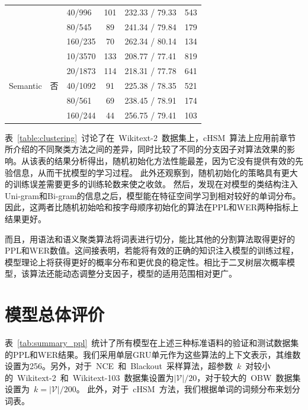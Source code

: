 \begin{table}[!t]
\begin{tabular}{lclccc}
    &&40/996 &101&232.33 / 79.33&543\\
    &&80/545 &89&241.34 / 79.84&179\\
    &&160/235 &70&262.34 / 80.14&134\\
  \midrule
  \multirow{5}{*}{Semantic}  &\multirow{5}{*}{否} &10/3570 &133&208.77 / 77.41&819\\
    & &20/1873 &114&218.31 / 77.78&641\\
    & &40/1092 &91&225.38 / 78.35&521\\
    & &80/561 &69&238.45 / 78.91&174\\
    & &160/244 &44&256.75 / 79.41&103\\
\bottomrule
  \end{tabular}
\end{table}

表~\ref{table:clustering}~讨论了在~Wikitext-2~数据集上，cHSM~算法上应用前章节所介绍的不同聚类方法之间的差异，同时比较了不同的分支因子对算法效果的影响。从该表的结果分析得出，随机初始化方法性能最差，因为它没有提供有效的先验信息，从而干扰模型的学习过程。
此外还观察到，随机初始化的策略具有更大的训练误差需要更多的训练轮数来使之收敛。
然后，发现在对模型的类结构注入Uni-gram和Bi-gram的信息之后，模型能在特征空间学习到相对较好的单词分布。
因此，这两者比随机初始哈和按字母顺序初始化的算法在PPL和WER两种指标上结果更好。

而且，用语法和语义聚类算法将词表进行切分，能比其他的分割算法取得更好的PPL和WER数值。这间接表明，若能将有效的正确的知识注入模型的训练过程，模型理论上将获得更好的概率分布和更优良的稳定性。相比于二叉树层次概率模型，该算法还能动态调整分支因子，模型的适用范围相对更广。

\section{模型总体评价}
表~\ref{tab:summary_ppl}~统计了所有模型在上述三种标准语料的验证和测试数据集的PPL和WER结果。我们采用单层GRU单元作为这些算法的上下文表示，其维数设置为256。另外，对于~NCE~和~Blackout~采样算法，超参数~$k$~对较小的~Wikitext-2~和~Wikitext-103~数据集设置为$\mathcal{|V|}/20$，对于较大的~OBW~数据集设置为~$k=|\mathcal{V}|/200$。 此外，对于~cHSM~方法，我们根据单词的词频分布来划分词表。

